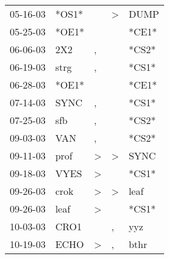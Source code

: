 \begin{supertabular}{p{0.07\textwidth}p{0.06\textwidth}p{0.02\textwidth}p{0.02\textwidth}p{0.06\textwidth}}
          05-16-03\textsuperscript{} &                            *OS1* &                  &     \textgreater &           DUMP\textsuperscript{} \\
          05-25-03\textsuperscript{} &                            *OE1* &                  &                  &                            *CE1* \\
          06-06-03\textsuperscript{} &            2X2\textsuperscript{} &                , &                  &                            *CS2* \\
          06-19-03\textsuperscript{} &           strg\textsuperscript{} &                , &                  &                            *CS1* \\
          06-28-03\textsuperscript{} &                            *OE1* &                  &                  &                            *CE1* \\
          07-14-03\textsuperscript{} &           SYNC\textsuperscript{} &                , &                  &                            *CS1* \\
          07-25-03\textsuperscript{} &            sfb\textsuperscript{} &                , &                  &                            *CS2* \\
          09-03-03\textsuperscript{} &            VAN\textsuperscript{} &                , &                  &                            *CS2* \\
          09-11-03\textsuperscript{} &           prof\textsuperscript{} &     \textgreater &     \textgreater &           SYNC\textsuperscript{} \\
          09-18-03\textsuperscript{} &           VYES\textsuperscript{} &     \textgreater &                  &                            *CS1* \\
          09-26-03\textsuperscript{} &           crok\textsuperscript{} &     \textgreater &     \textgreater &           leaf\textsuperscript{} \\
          09-26-03\textsuperscript{} &           leaf\textsuperscript{} &     \textgreater &                  &                            *CS1* \\
          10-03-03\textsuperscript{} &           CRO1\textsuperscript{} &                  &                , &            yyz\textsuperscript{} \\
          10-19-03\textsuperscript{} &           ECHO\textsuperscript{} &     \textgreater &                , &           bthr\textsuperscript{} \\

\end{supertabular}
